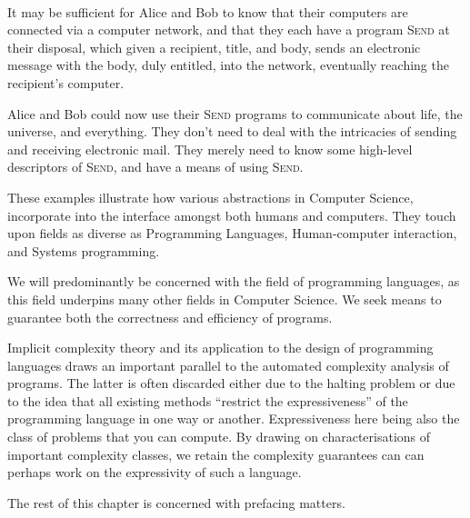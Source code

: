 \begin{example} \label{example:alice-bob-email} \

It may be sufficient for Alice and Bob to know that their computers are
connected via a computer network, and that they each have a program
\textsc{Send} at their disposal, which given a recipient, title, and body,
sends an electronic message with the body, duly entitled, into the network,
eventually reaching the recipient's computer.

Alice and Bob could now use their \textsc{Send} programs to communicate about
life, the universe, and everything. They don't need to deal with the
intricacies of sending and receiving electronic mail. They merely need to know
some high-level descriptors of \textsc{Send}, and have a means of using
\textsc{Send}.

\end{example}

These examples illustrate how various abstractions in Computer Science,
incorporate into the interface amongst both humans and computers. They touch
upon fields as diverse as Programming Languages, Human-computer interaction,
and Systems programming.

We will predominantly be concerned with the field of programming languages, as
this field underpins many other fields in Computer Science. We seek means to
guarantee both the correctness and efficiency of programs.

Implicit complexity theory and its application to the design of programming
languages draws an important parallel to the automated complexity analysis of
programs. The latter is often discarded either due to the halting problem or
due to the idea that all existing methods ``restrict the expressiveness'' of
the programming language in one way or another. Expressiveness here being also
the class of problems that you can compute. By drawing on characterisations of
important complexity classes, we retain the complexity guarantees can can
perhaps work on the expressivity of such a language.




The rest of this chapter is concerned with prefacing matters.
